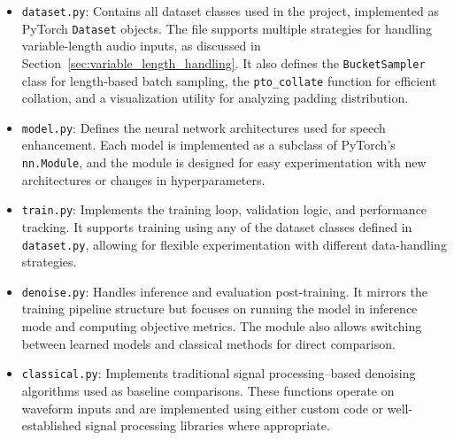 \begin{itemize}
    \item \texttt{dataset.py}: Contains all dataset classes used in the project, implemented as PyTorch \texttt{Dataset} objects. The file supports multiple strategies for handling variable-length audio inputs, as discussed in Section~\ref{sec:variable_length_handling}. It also defines the \texttt{BucketSampler} class for length-based batch sampling, the \texttt{pto\_collate} function for efficient collation, and a visualization utility for analyzing padding distribution.

    \item \texttt{model.py}: Defines the neural network architectures used for speech enhancement. Each model is implemented as a subclass of PyTorch’s \texttt{nn.Module}, and the module is designed for easy experimentation with new architectures or changes in hyperparameters.

    \item \texttt{train.py}: Implements the training loop, validation logic, and performance tracking. It supports training using any of the dataset classes defined in \texttt{dataset.py}, allowing for flexible experimentation with different data-handling strategies.

    \item \texttt{denoise.py}: Handles inference and evaluation post-training. It mirrors the training pipeline structure but focuses on running the model in inference mode and computing objective metrics. The module also allows switching between learned models and classical methods for direct comparison.

    \item \texttt{classical.py}: Implements traditional signal processing–based denoising algorithms used as baseline comparisons. These functions operate on waveform inputs and are implemented using either custom code or well-established signal processing libraries where appropriate.
\end{itemize}
